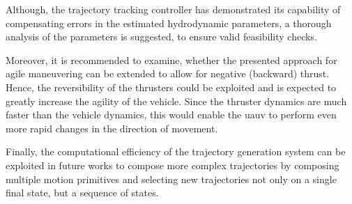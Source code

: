 Although, the trajectory tracking controller has demonstrated its capability of compensating errors in the estimated hydrodynamic parameters, a thorough analysis of the parameters is suggested, to ensure valid feasibility checks.

Moreover, it is recommended to examine, whether the presented approach for agile maneuvering can be extended to allow for negative (backward) thrust. Hence, the reversibility of the thrusters could be exploited and is expected to greatly increase the agility of the vehicle. Since the thruster dynamics are much faster than the vehicle dynamics, this would enable the \ac{uauv} to perform even more rapid changes in the direction of movement.

Finally, the computational efficiency of the trajectory generation system can be exploited in future works to compose more complex trajectories by composing multiple motion primitives and selecting new trajectories not only on a single final state, but a sequence of states.